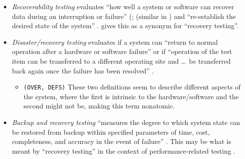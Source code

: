 \NewDocumentCommand{}

\begin{itemize}
    \item \emph{Recoverability testing} evaluates ``how well a system or
          software can recover data during an interruption or failure''
          \ifnotpaper (\citealp[p.~7\=/10]{SWEBOK2024}; \else
              \cite[p.~7\=/10]{SWEBOK2024} (\fi similar in \citealp{ISO_IEC2023a})
          and ``re-establish the desired state of the system''
          \citeyearpar{ISO_IEC2023a}.  \citet[p.~47]{Kam2008}
          gives this as a synonym for ``recovery testing''.
    \item \emph{Disaster/recovery testing} evaluates if a system
          can ``return to normal operation after a hardware
          or software failure'' \citep[p.~140]{IEEE2017} or if ``operation of
          the test item can be transferred to a different operating site and
          \dots\ be transferred back again once the failure has been
          resolved'' \citeyearpar[p.~37]{IEEE2021c}.
          \begin{itemize}
              \item \texttt{(OVER, DEFS)}
                    These two definitions seem to describe different aspects of
                    the system, where the first is intrinsic to the
                    hardware/software and the second might not be, making this
                    term nonatomic.
          \end{itemize}
    \item \emph{Backup and recovery testing} ``measures the
          degree to which system state can be restored from backup within
          specified parameters of time, cost, completeness, and accuracy in
          the event of failure'' \citep[p.~2]{IEEE2013}. This may be what is
          meant by ``recovery testing'' in the context of performance-related
          testing \citeyearpar[Fig.~2]{IEEE2022}.

\end{itemize}
